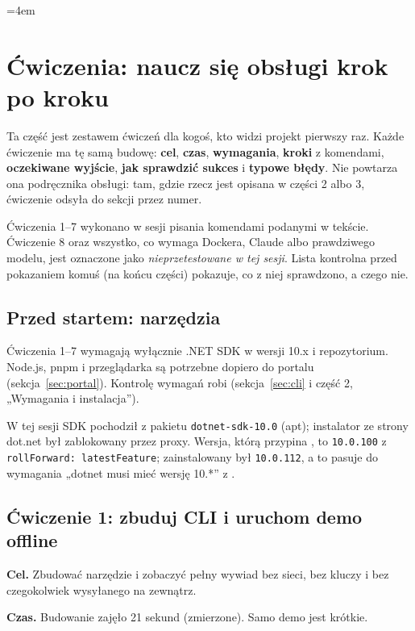 {\sloppy\emergencystretch=4em
\section{Ćwiczenia: naucz się obsługi krok po kroku}
\label{sec:cwiczenia}

Ta część jest zestawem ćwiczeń dla kogoś, kto widzi projekt pierwszy raz. Każde
ćwiczenie ma tę samą budowę: \textbf{cel}, \textbf{czas}, \textbf{wymagania},
\textbf{kroki} z komendami, \textbf{oczekiwane wyjście}, \textbf{jak sprawdzić
sukces} i \textbf{typowe błędy}. Nie powtarza ona podręcznika obsługi: tam, gdzie
rzecz jest opisana w części 2 albo 3, ćwiczenie odsyła do sekcji przez numer.

 Ćwiczenia 1--7 wykonano w sesji
pisania komendami podanymi w tekście. Ćwiczenie 8 oraz wszystko, co wymaga
Dockera, Claude albo prawdziwego modelu, jest oznaczone jako
\emph{nieprzetestowane w tej sesji}. Lista kontrolna przed pokazaniem komuś
(na końcu części) pokazuje, co z niej sprawdzono, a czego nie.

\subsection{Przed startem: narzędzia}

Ćwiczenia 1--7 wymagają wyłącznie .NET SDK w wersji 10.x i repozytorium. Node.js,
pnpm i przeglądarka są potrzebne dopiero do portalu (sekcja~\ref{sec:portal}).
Kontrolę wymagań robi 
(sekcja~\ref{sec:cli} i część 2, „Wymagania i instalacja”).

W tej sesji SDK pochodził z pakietu \texttt{dotnet-sdk-10.0} (apt); instalator
ze strony dot.net był zablokowany przez proxy. Wersja, którą przypina
, to \texttt{10.0.100} z \texttt{rollForward: latestFeature};
zainstalowany był \texttt{10.0.112}, a to pasuje do wymagania „dotnet musi mieć
wersję 10.*” z .

\subsection{Ćwiczenie 1: zbuduj CLI i uruchom demo offline}

\textbf{Cel.} Zbudować narzędzie  i zobaczyć pełny
wywiad bez sieci, bez kluczy i bez czegokolwiek wysyłanego na zewnątrz.

\textbf{Czas.} Budowanie zajęło 21 sekund (zmierzone). Samo demo jest krótkie.

}
